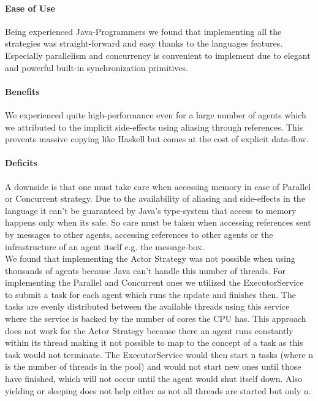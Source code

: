 \paragraph{Ease of Use}
Being experienced Java-Programmers we found that implementing all the strategies was straight-forward and easy thanks to the languages features. Especially parallelism and concurrency is convenient to implement due to elegant and powerful built-in synchronization primitives.

\paragraph{Benefits}
We experienced quite high-performance even for a large number of agents which we attributed to the implicit side-effects using aliasing through references. This prevents massive copying like Haskell but comes at the cost of explicit data-flow.

\paragraph{Deficits}
A downside is that one must take care when accessing memory in case of Parallel or Concurrent strategy. Due to the availability of aliasing and side-effects in the language it can't be guaranteed by Java's type-system that access to memory happens only when its safe. So care must be taken when accessing references sent by messages to other agents, accessing references to other agents or the infrastructure of an agent itself e.g. the message-box. \\
We found that implementing the Actor Strategy was not possible when using thousands of agents because Java can't handle this number of threads. For implementing the Parallel and Concurrent ones we utilized the ExecutorService to submit a task for each agent which runs the update and finishes then. The tasks are evenly distributed between the available threads using this service where the service is backed by the number of cores the CPU has. This approach does not work for the Actor Strategy because there an agent runs constantly within its thread making it not possible to map to the concept of a task as this task would not terminate. The ExecutorService would then start n tasks (where n is the number of threads in the pool) and would not start new ones until those have finished, which will not occur until the agent would shut itself down. Also yielding or sleeping does not help either as not all threads are started but only n. 

